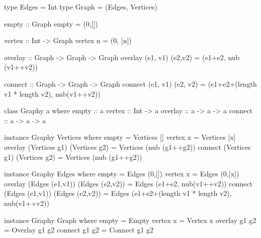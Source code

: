 \documentclass[11pt,a4paper]{article}
\begin{document}

\codesol
\ifsolutions
\begin{code}
type Edges = Int
type Graph = (Edges, Vertices)

empty :: Graph
empty = (0,[])

vertex :: Int -> Graph
vertex n = (0, [n])

overlay :: Graph -> Graph -> Graph
overlay (e1, v1) (e2,v2) = (e1+e2, nub (v1++v2))

connect :: Graph -> Graph -> Graph
connect (e1, v1) (e2, v2) = (e1+e2+(length v1 * length v2), nub(v1++v2))
\end{code}
\fi





\codesol
\ifsolutions
\begin{code}
  class Graphy a where
    empty  :: a
    vertex  :: Int -> a
    overlay  :: a -> a -> a
    connect  :: a -> a -> a
\end{code}
\fi


\codesol
\ifsolutions
\begin{code}
instance Graphy Vertices where
  empty = Vertices []
  vertex x = Vertices [x]
  overlay (Vertices g1) (Vertices g2) = Vertices (nub (g1++g2))
  connect (Vertices g1) (Vertices g2) = Vertices (nub (g1++g2))

instance Graphy Edges where
  empty = Edges (0,[])
  vertex x = Edges (0,[x])
  overlay (Edges (e1,v1)) (Edges (e2,v2)) = Edges (e1+e2, nub(v1++v2))
  connect (Edges (e1,v1)) (Edges (e2,v2)) = Edges (e1+e2+(length v1 * length v2), nub(v1++v2))

instance Graphy Graph where
  empty = Empty
  vertex x = Vertex x
  overlay g1 g2 = Overlay g1 g2
  connect g1 g2 = Connect g1 g2
\end{code}
\fi
\end{document}
